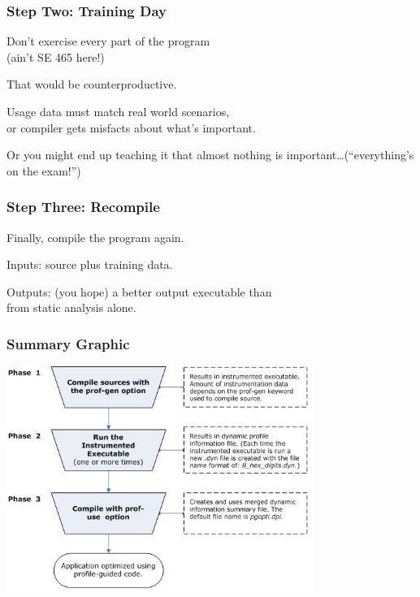 \begin{frame}
\frametitle{Step Two: Training Day}

\large
\begin{changemargin}{2cm}
Don't exercise every part of the program\\
(ain't SE 465 here!)

That would be counterproductive.

Usage data must match real world scenarios,\\
or compiler gets misfacts about what's important. 

Or you might end up teaching it that almost nothing
is important\ldots (``everything's on the exam!'')
\end{changemargin}

\end{frame}



\begin{frame}
\frametitle{Step Three: Recompile}

\large
\begin{changemargin}{2cm}
Finally, compile the program again.

Inputs: source plus training data.

Outputs: (you hope) a better output executable than\\
from static analysis alone.
\end{changemargin}

\end{frame}



\begin{frame}
\frametitle{Summary Graphic}

\begin{center}
	\includegraphics[width=0.75\textwidth]{images/pogo-workflow.jpg}
\end{center}

\end{frame}



